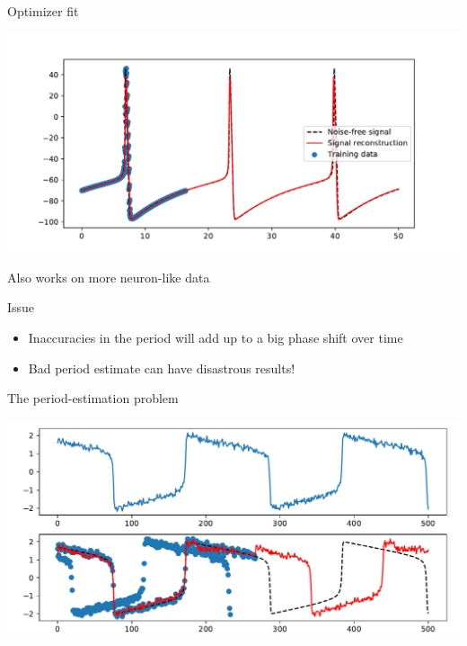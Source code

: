 \documentclass[presentation]{beamer}
\begin{document}
\begin{frame}[label={sec:orgc5ebf6e}]{Optimizer fit}
  \begin{center}
\includegraphics[width=.9\linewidth]{./HHFit2.pdf}
\end{center}
Also works on more neuron-like data
\end{frame}

\begin{frame}[label={sec:org1ecfa01}]{Issue}
\begin{itemize}
\item Inaccuracies in the period will add up to a big phase shift over time
\item Bad period estimate can have disastrous results!
\end{itemize}
\end{frame}

\begin{frame}[label={sec:org10b70f1}]{The period-estimation problem}
\begin{center}
\includegraphics[width=.9\linewidth]{./brokenF0.pdf}
\end{center}
\end{frame}
\end{document}
